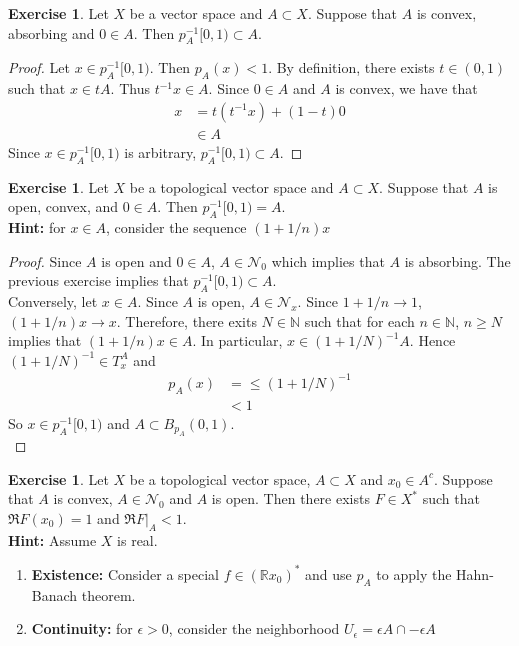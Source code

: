 \documentclass[12pt]{amsart}
\theoremstyle{definition}
\newtheorem{ex}[definition]{Exercise}
\newcommand{\ep}{\epsilon}
\newcommand{\N}{\mathbb{N}}
\newcommand{\R}{\mathbb{R}}
\newcommand{\MN}{\mathcal{N}}
\begin{document}
	\begin{ex}
		Let $X$ be a vector space and $A \subset X$. Suppose that $A$ is convex, absorbing and $0 \in A$. Then $p_A^{-1}[0, 1) \subset A$. 
	\end{ex}

	\begin{proof}
		Let $x \in p_A^{-1}[0, 1)$. Then $p_A(x) < 1$. By definition, there exists $t \in (0,1)$ such that $x \in tA$. Thus $t^{-1}x \in A$. Since $0 \in A$ and $A$ is convex, we have that 
		\begin{align*}
			x
			&= t (t^{-1}x) + (1-t)0 \\
			& \in A
		\end{align*}
	 	Since $x \in p_A^{-1}[0, 1)$ is arbitrary, $p_A^{-1}[0, 1) \subset A$.
	\end{proof}

		\begin{ex}
		Let $X$ be a topological vector space and $A \subset X$. Suppose that $A$ is open, convex, and $0 \in A$. Then $p_A^{-1}[0, 1) = A$.\\
		\textbf{Hint:} for $x \in A$, consider the sequence $(1 + 1/n)x$
	\end{ex}
	
	\begin{proof}
		Since $A$ is open and $0 \in A$, $A \in \MN_0$ which implies that $A$ is absorbing. The previous exercise implies that $p_A^{-1}[0, 1) \subset A$. \\
		Conversely, let $x \in A$. Since $A$ is open, $A \in \MN_x$. Since $1 + 1/n \rightarrow 1$, $(1 + 1/n)x \rightarrow x$. Therefore, there exits $N \in \N$ such that for each $n \in \N$, $n \geq N$ implies that $(1 + 1/n)x \in A$. In particular, $x \in (1 + 1/N)^{-1}A$. Hence $(1 + 1/N)^{-1} \in T_x^A$ and
		\begin{align*}
			p_A(x)
			&= \leq (1 + 1/N)^{-1} \\
			& < 1
		\end{align*}
		So $x \in p_A^{-1}[0, 1)$ and $A \subset B_{p_A}(0,1)$. \\
	\end{proof}

	\begin{ex}
		Let $X$ be a topological vector space, $A \subset X$ and $x_0 \in A^c$. Suppose that $A$ is convex, $A \in \MN_0$ and $A$ is open. Then there exists $F \in X^*$ such that $\Re F(x_0) =1$ and $\Re F|_A < 1$. \\
		\textbf{Hint:} Assume $X$ is real.
		\begin{enumerate}
			\item \textbf{Existence:} Consider a special $f \in (\R x_0)^*$ and use $p_A$ to apply the Hahn-Banach theorem.
			\item \textbf{Continuity:} for $\ep > 0$, consider the neighborhood $U_{\ep} = \ep A \cap - \ep A$
		\end{enumerate} 
	\end{ex}
\end{document}
